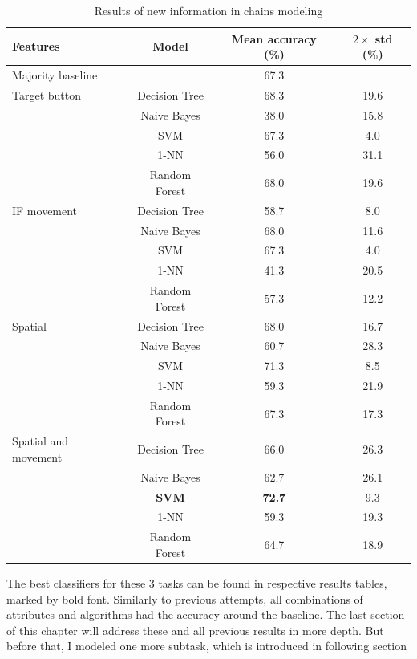 \begin{table}[!htbp]
 \centering
\begin{tabular}{lccc}
\toprule
Features & Model    & Mean accuracy (\%) &  $2\times$ std (\%) \\
\midrule
 Majority baseline  &   & 67.3	& \\
\midrule
Target button 	& Decision Tree 	& 68.3	& 19.6 	\\
				& Naive Bayes  	& 38.0	& 15.8	\\
				& SVM 			& 67.3	& 4.0 	\\
				& 1-NN			& 56.0	& 31.1 	\\
				& Random Forest	& 68.0	& 19.6	\\
\midrule
IF movement	& Decision Tree 	& 	58.7	& 8.0 \\
			& Naive Bayes  	&	68.0	& 11.6	\\
			& SVM 			&	67.3	& 4.0 	\\
			& 1-NN			&	41.3	& 20.5 	\\
			& Random Forest	&	57.3& 12.2 	\\
			
\midrule
Spatial	 	& Decision Tree 	& 68.0	& 16.7 \\
			& Naive Bayes  	& 60.7 	& 28.3	\\
			& SVM 			& 71.3	& 8.5 	\\
			& 1-NN			& 59.3	& 21.9 \\
			& Random Forest	& 67.3	& 17.3 \\	

\midrule
Spatial and movement& Decision Tree 	& 66.0	& 26.3 \\
					& Naive Bayes  	& 62.7	& 26.1	\\
					& \textbf{SVM} 	& \textbf{72.7}	& 9.3 	\\
					& 1-NN			& 59.3	& 19.3 \\
					& Random Forest	& 64.7	& 18.9 \\	 	
\bottomrule
\end{tabular}
\caption{Results of new information in chains modeling}
\label{tab:chains-ml-infgain}
\end{table}

The best classifiers for these 3 tasks can be found in respective results tables, marked by bold font. Similarly to previous attempts, all combinations of attributes and algorithms had the accuracy around the baseline. The last section of this chapter will address these and all previous results in more depth. But before that, I modeled one more subtask, which is introduced in following section

